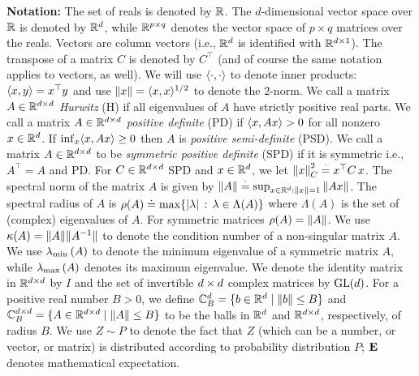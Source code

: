\textbf{Notation:} The set of reals is denoted by $\mathbb{R}$. 
The $d$-dimensional vector space over $\mathbb{R}$ is denoted by $\mathbb{R}^{d}$,
while $\mathbb{R}^{p\times q}$ denotes the vector space of $p\times q$ matrices over the reals.
Vectors are column vectors (i.e., $\mathbb{R}^d$ is identified with $\mathbb{R}^{d\times 1}$).
The transpose of a matrix $C$ is denoted by $C^\top$
(and of course the same notation applies to vectors, as well). 
We will use $\langle\cdot,\cdot\rangle$ to denote inner products: $\langle x,y\rangle=x^\top y$
and use $\left\| x\right\| = \langle x,x\rangle^{1/2}$ to denote the $2$-norm.
We call a matrix $A\in \mathbb{R}^{d \times d}$  \emph{Hurwitz} (H) if all eigenvalues of $A$ have strictly positive real parts. 
We call a matrix $A\in \mathbb{R}^{d \times d}$ \emph{positive definite} (PD) if $\langle x,Ax\rangle >0$ for all nonzero $x \in \mathbb{R}^{d}$.
If $\inf_x \langle x,Ax\rangle\ge 0$ then $A$ is \emph{positive semi-definite} (PSD).
We call a matrix $A\in \mathbb{R}^{d \times d}$ to be \emph{symmetric positive definite} (SPD) if 
it is symmetric i.e., $A^\top=A$ and PD. 
For $C\in \mathbb{R}^{d \times d}$ SPD and $x\in \mathbb{R}^d$, we let $\left\| x\right\|^2_C\stackrel{\cdot}{=} x^\top C \,x$.
The spectral norm of the matrix $A$ is given by $\left\| A\right\|\stackrel{\cdot}{=} \sup_{x\in \mathbb{R}^d:\left\| x\right\|=1} \left\| Ax\right\|$.  
The spectral radius of $A$ is $\rho(A)\doteq \max\{ |\lambda|\,:\, \lambda \in \Lambda(A) \}$ where $\Lambda(A)$ is the set of (complex) eigenvalues of $A$. For symmetric matrices $\rho(A) = \left\| A\right\|$.
We use $\kappa(A)=\| A\|\| A^{-1}\|$ to denote the condition number of a non-singular matrix $A$. 
We use $\lambda_{\min}\left(A\right)$ to denote the minimum eigenvalue of a symmetric matrix $A$, while $\lambda_{\max}\left(A\right)$ denotes its maximum eigenvalue.
We denote the identity matrix in $\mathbb{R}^{d \times d}$ by $I$ 
and the set of invertible $d \times d$ complex matrices by $\mathrm{GL}(d)$. 
For a positive real number $B>0$, we define $\mathbb{C}^{d}_B=\{b\in \mathbb{R}^d\mid \left\| b\right\|\leq B\}$ and $\mathbb{C}^{d \times d}_B=\{A\in \mathbb{R}^{d \times d}\mid \left\| A\right\|\leq B\}$ to be the balls in $\mathbb{R}^d$ and $\mathbb{R}^{d\times d}$, respectively, of radius $B$.  
We use $Z\sim P$ to denote the fact that $Z$ (which can be a number, or vector, or matrix) is distributed according to probability distribution $P$; $\mathbf{E}$ denotes mathematical expectation. 

